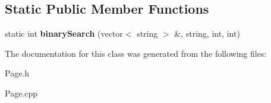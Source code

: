 \subsection*{Static Public Member Functions}
\begin{DoxyCompactItemize}
\item 
\hypertarget{class_page_a8f1ef6fe4e22e67941a00bb6f5ff4be4}{static int {\bfseries binary\+Search} (vector$<$ string $>$ \&, string, int, int)}\label{class_page_a8f1ef6fe4e22e67941a00bb6f5ff4be4}

\end{DoxyCompactItemize}


The documentation for this class was generated from the following files\+:\begin{DoxyCompactItemize}
\item 
Page.\+h\item 
Page.\+cpp\end{DoxyCompactItemize}
